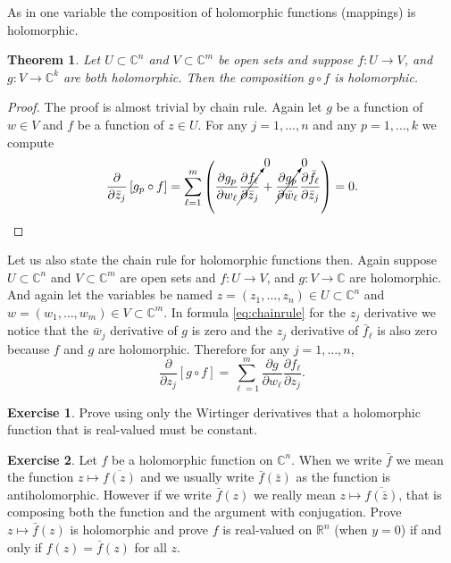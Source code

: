 \documentclass[12pt,openany]{book}
\newcommand{\C}{{\mathbb{C}}}
\newcommand{\R}{{\mathbb{R}}}
\theoremstyle{plain}
\newtheorem{thm}{Theorem}[section]
\theoremstyle{remark}
\theoremstyle{definition}
\newenvironment{exbox}{%
    \def\FrameCommand{\vrule width 1pt \relax\hspace {10pt}}%
    \MakeFramed {\advance \hsize -\width \FrameRestore }%
}{%
    \endMakeFramed
}
\theoremstyle{exercise}
\newtheorem{exercise}{Exercise}[section]
\theoremstyle{example}
\begin{document}
As in one variable the composition of holomorphic functions (mappings) is
holomorphic.

\begin{thm}
Let $U \subset \C^n$ and $V \subset \C^m$ be open sets and suppose
$f \colon U \to V$, and $g \colon V \to \C^k$ are both holomorphic.
Then the composition $g \circ f$ is holomorphic.
\end{thm}

\begin{proof}
The proof is almost trivial by chain rule.
Again let $g$ be a function of $w \in V$ and $f$ be a function of $z \in U$.
For any $j = 1,\ldots,n$ and any $p=1,\ldots,k$ we compute
\begin{equation*}
\frac{\partial}{\partial \bar{z}_j} \left[ g_p \circ f \right]
=
\sum_{\ell=1}^m 
\left(
\frac{\partial g_p}{\partial w_\ell} 
\cancelto{0}{\frac{\partial f_\ell}{\partial \bar{z}_j}}
+
\cancelto{0}{\frac{\partial g_p}{\partial \bar{w}_\ell}}
\frac{\partial \bar{f}_\ell}{\partial \bar{z}_j} 
\right)
=
0 . \qedhere
\end{equation*}
\end{proof}

Let us also state the chain rule for holomorphic functions then.
Again suppose 
$U \subset \C^n$ and $V \subset \C^m$ are open sets and 
$f \colon U \to V$, and $g \colon V \to \C$ are holomorphic.
And again let the variables be named
$z = (z_1,\ldots,z_n) \in U \subset \C^n$ and $w = (w_1,\ldots,w_m) \in V
\subset \C^m$.  In formula \eqref{eq:chainrule} for the $z_j$ derivative we notice that 
the $\bar{w}_j$ derivative of $g$ is zero and the $z_j$ derivative of
$\bar{f}_\ell$ is also zero because $f$ and $g$ are holomorphic.
Therefore for any $j=1,\ldots,n$,
\begin{equation*}
\frac{\partial}{\partial z_j} \left[ g \circ f \right]
=
\sum_{\ell=1}^m 
\frac{\partial g}{\partial w_\ell}
\frac{\partial f_\ell}{\partial z_j} .
\end{equation*}

\begin{exbox}
\begin{exercise}
Prove using only the Wirtinger derivatives that a holomorphic function
that is real-valued must be constant.
\end{exercise}

\begin{exercise}
Let $f$ be a holomorphic function on $\C^n$.
When we write $\bar{f}$ we mean the function $z \mapsto \overline{f(z)}$
and we usually write $\bar{f}(\bar{z})$ as the function is antiholomorphic.
However if we write $\bar{f}(z)$ we really mean $z \mapsto \overline{f(\bar{z})}$,
that is composing both the function and the argument with conjugation.
Prove $z \mapsto \bar{f}(z)$ is holomorphic and prove $f$ is
real-valued on $\R^n$ (when $y=0$) if and only if $f(z) =
\bar{f}(z)$ for all $z$.
\end{exercise}
\end{exbox}
\end{document}
